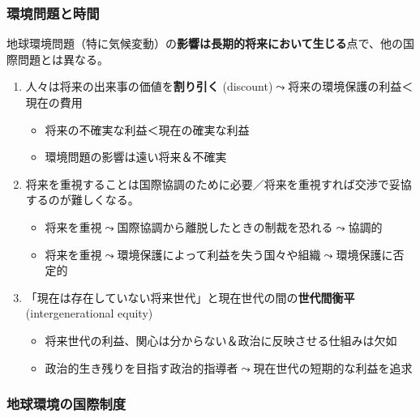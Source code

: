 \documentclass[
  xelatex,
  ja=standard]{bxjsarticle}
\providecommand{\tightlist}{%
  \setlength{\itemsep}{0pt}\setlength{\parskip}{0pt}}\usepackage{longtable,booktabs,array}
\begin{document}
\hypertarget{ux74b0ux5883ux554fux984cux3068ux6642ux9593}{%
\subsubsection{環境問題と時間}\label{ux74b0ux5883ux554fux984cux3068ux6642ux9593}}

地球環境問題（特に気候変動）の\textbf{影響は長期的将来において生じる}点で、他の国際問題とは異なる。

\begin{enumerate}
\def\labelenumi{\arabic{enumi}.}
\tightlist
\item
  人々は将来の出来事の価値を\textbf{割り引く}
  (discount)\(\leadsto\)将来の環境保護の利益＜現在の費用

  \begin{itemize}
  \tightlist
  \item
    将来の不確実な利益＜現在の確実な利益
  \item
    環境問題の影響は遠い将来＆不確実
  \end{itemize}
\item
  将来を重視することは国際協調のために必要／将来を重視すれば交渉で妥協するのが難しくなる。

  \begin{itemize}
  \tightlist
  \item
    将来を重視\(\leadsto\)国際協調から離脱したときの制裁を恐れる\(\leadsto\)協調的
  \item
    将来を重視\(\leadsto\)環境保護によって利益を失う国々や組織\(\leadsto\)環境保護に否定的
  \end{itemize}
\item
  「現在は存在していない将来世代」と現在世代の間の\textbf{世代間衡平}
  (intergenerational equity)

  \begin{itemize}
  \tightlist
  \item
    将来世代の利益、関心は分からない＆政治に反映させる仕組みは欠如
  \item
    政治的生き残りを目指す政治的指導者\(\leadsto\)現在世代の短期的な利益を追求
  \end{itemize}
\end{enumerate}

\hypertarget{ux5730ux7403ux74b0ux5883ux306eux56fdux969bux5236ux5ea6}{%
\subsubsection{地球環境の国際制度}\label{ux5730ux7403ux74b0ux5883ux306eux56fdux969bux5236ux5ea6}}
\end{document}
